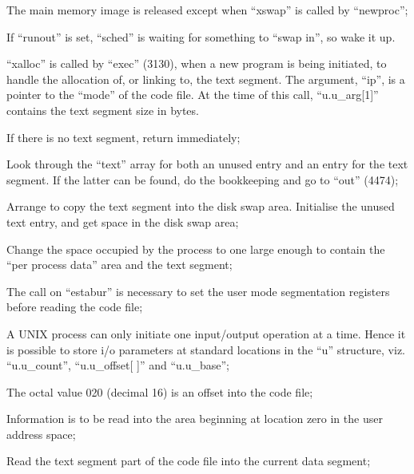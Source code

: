 \item[4382:] The main memory image is released
 except when ``xswap'' is called by
 ``newproc'';

\item[4388:] If ``runout'' is set, ``sched'' is
 waiting for something to ``swap
 in'', so wake it up.
\ed


``xalloc'' is called by ``exec'' (3130),
when a new program is being initiated,
to handle the allocation of, or linking
to, the text segment. The argument,
``ip'', is a pointer to the ``mode'' of the
code file. At the time of this call,
``u.u\_arg[1]'' contains the text segment
size in bytes.

\bd
\item[4439:] If there is no text segment,
 return immediately;

\item[4441:] Look through the ``text'' array for
 both an unused entry and an entry
 for the text segment. If the
 latter can be found, do the bookkeeping and go to ``out'' (4474);

\item[4452:] Arrange to copy the text segment
 into the disk swap area. Initialise the unused text entry, and
 get space in the disk swap area;

\item[4459:] Change the space occupied by the
 process to one large enough to
 contain the ``per process data''
 area and the text segment;

\item[4460:] The call on ``estabur'' is necessary to set the user mode
segmentation registers before reading the code file;

\item[4461:] A UNIX process can only initiate
 one input/output operation at a
 time. Hence it is possible to
 store i/o parameters at standard
 locations in the ``u'' structure,
 viz. ``u.u\_count'', ``u.u\_offset[ ]'' and
``u.u\_base'';



\item[4462:] The octal value 020 (decimal 16)
 is an offset into the code file;

\item[4463:] Information is to be read into
the area beginning at location
zero in the user address space;

\item[4464:] Read the text segment part of the
code file into the current data
segment;

